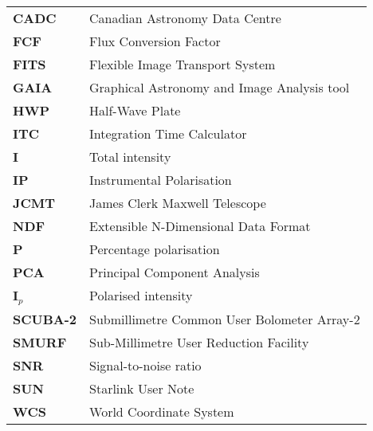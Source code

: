 \documentclass[11pt,oneside,chapters]{starlink}
\begin{document}
\scfrontmatter





\Acronyms

\begin{table}[h!]
\begin{tabular}{ll}
\textbf{CADC}   & Canadian Astronomy Data Centre\\
\textbf{FCF}    & Flux Conversion Factor\\
\textbf{FITS}   & Flexible Image Transport System\\
\textbf{GAIA}   & Graphical Astronomy and Image Analysis tool\\
\textbf{HWP}    & Half-Wave Plate\\
\textbf{ITC}    & Integration Time Calculator\\
\textbf{I}      & Total intensity \\
\textbf{IP}     & Instrumental Polarisation \\
\textbf{JCMT}   & James Clerk Maxwell Telescope\\
\textbf{NDF}    & Extensible N-Dimensional Data Format\\
\textbf{P}      & Percentage polarisation \\
\textbf{PCA}    & Principal Component Analysis \\
\textbf{I$_{p}$}     & Polarised intensity \\
\textbf{SCUBA-2}& Submillimetre Common User Bolometer Array-2\\
\textbf{SMURF}  & Sub-Millimetre User Reduction Facility\\
\textbf{SNR}    & Signal-to-noise ratio\\
\textbf{SUN}    & Starlink User Note\\
\textbf{WCS}    & World Coordinate System\\
\end{tabular}
\end{table}
\end{document}
